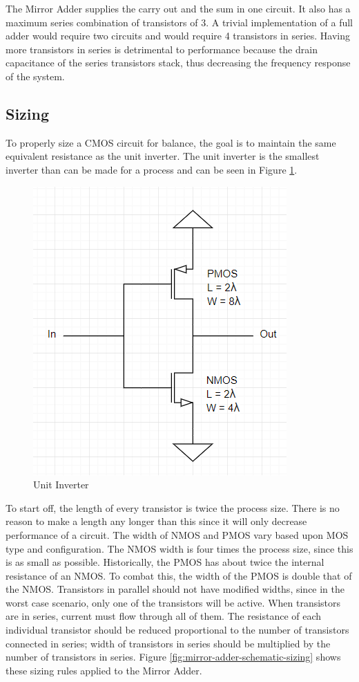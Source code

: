 \documentclass[11pt]{article}
\begin{document}
		The Mirror Adder supplies the carry out and the sum in one circuit. It also has a maximum series combination of transistors of 3. A trivial implementation of a full adder would require two circuits and would require 4 transistors in series. Having more transistors in series is detrimental to performance because the drain capacitance of the series transistors stack, thus decreasing the frequency response of the system. 
	
	\subsection{Sizing}
	 
	 	To properly size a CMOS circuit for balance, the goal is to maintain the same equivalent resistance as the unit inverter. The unit inverter is the smallest inverter than can be made for a process and can be seen in Figure \ref{fig:unit-inverter}.
	 	
	 	
		\begin{figure}[H]
			\centering
			\includegraphics[width=0.45\linewidth]{"Pictures/Unit Inverter"}
			\caption{Unit Inverter}
			\label{fig:unit-inverter}
		\end{figure}
	
		To start off, the length of every transistor is twice the process size. There is no reason to make a length any longer than this since it will only decrease performance of a circuit. The width of NMOS and PMOS vary based upon MOS type and configuration. The NMOS width is four times the process size, since this is as small as possible. Historically, the PMOS has about twice the internal resistance of an NMOS. To combat this, the width of the PMOS is double that of the NMOS. Transistors in parallel should not have modified widths, since in the worst case scenario, only one of the transistors will be active. When transistors are in series, current must flow through all of them. The resistance of each individual transistor should be reduced proportional to the number of transistors connected in series; width of transistors in series should be multiplied by the number of transistors in series. Figure \ref{fig:mirror-adder-schematic-sizing} shows these sizing rules applied to the Mirror Adder.
		
\end{document}
